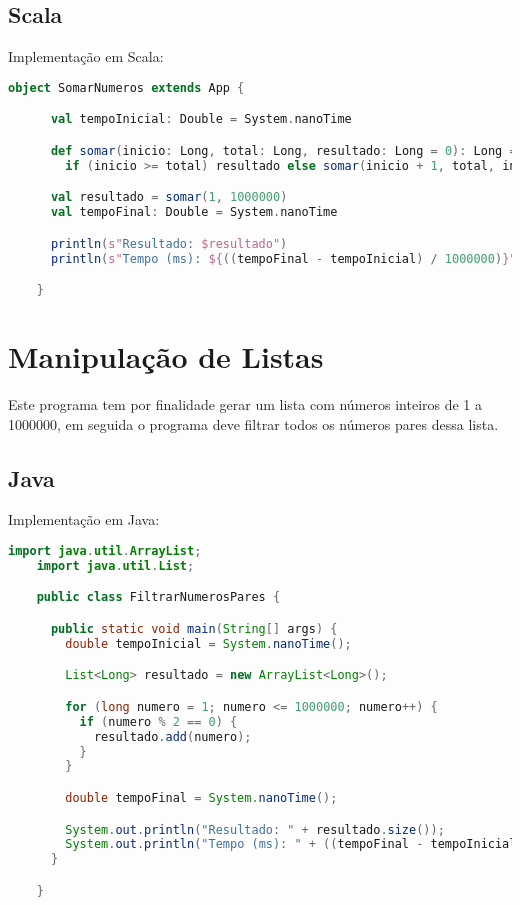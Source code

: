   \subsection{Scala}

    Implementação em Scala:

    \begin{lstlisting}[language=Scala, mathescape=false]
    object SomarNumeros extends App {

      val tempoInicial: Double = System.nanoTime

      def somar(inicio: Long, total: Long, resultado: Long = 0): Long =
        if (inicio >= total) resultado else somar(inicio + 1, total, inicio + resultado)

      val resultado = somar(1, 1000000)
      val tempoFinal: Double = System.nanoTime

      println(s"Resultado: $resultado")
      println(s"Tempo (ms): ${((tempoFinal - tempoInicial) / 1000000)}")

    }
    \end{lstlisting}


\section{Manipulação de Listas}

  Este programa tem por finalidade gerar um lista com números inteiros de 1 a 1000000, em seguida o programa deve filtrar todos os números pares dessa lista.

  \subsection{Java}

    Implementação em Java:

    \begin{lstlisting}[language=Java, mathescape=false]
    import java.util.ArrayList;
    import java.util.List;

    public class FiltrarNumerosPares {

      public static void main(String[] args) {
        double tempoInicial = System.nanoTime();

        List<Long> resultado = new ArrayList<Long>();

        for (long numero = 1; numero <= 1000000; numero++) {
          if (numero % 2 == 0) {
            resultado.add(numero);
          }
        }

        double tempoFinal = System.nanoTime();

        System.out.println("Resultado: " + resultado.size());
        System.out.println("Tempo (ms): " + ((tempoFinal - tempoInicial) / 1000000));
      }

    }
    \end{lstlisting}

